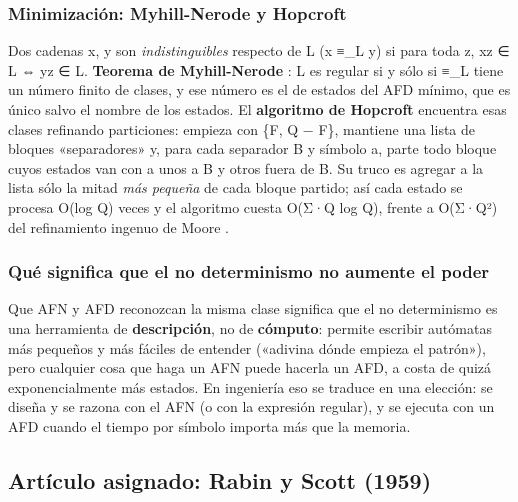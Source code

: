 \hypertarget{minimizaciuxf3n-myhill-nerode-y-hopcroft}{%
\subsubsection{Minimización: Myhill-Nerode y Hopcroft}\label{minimizaciuxf3n-myhill-nerode-y-hopcroft}}

Dos cadenas x, y son \emph{indistinguibles} respecto de L (x ≡\_L y) si para toda z, xz ∈ L ⇔ yz ∈ L. \textbf{Teorema de Myhill-Nerode} \autocite{nerode1958}: L es regular si y sólo si ≡\_L tiene un número finito de clases, y ese número es el de estados del AFD mínimo, que es único salvo el nombre de los estados. El \textbf{algoritmo de Hopcroft} \autocite{hopcroft1971} encuentra esas clases refinando particiones: empieza con \{F, Q − F\}, mantiene una lista de bloques «separadores» y, para cada separador B y símbolo a, parte todo bloque cuyos estados van con a unos a B y otros fuera de B. Su truco es agregar a la lista sólo la mitad \emph{más pequeña} de cada bloque partido; así cada estado se procesa O(log \textbar Q\textbar) veces y el algoritmo cuesta O(\textbar Σ\textbar·\textbar Q\textbar{} log \textbar Q\textbar), frente a O(\textbar Σ\textbar·\textbar Q\textbar²) del refinamiento ingenuo de Moore \autocite{moore1971}.

\hypertarget{quuxe9-significa-que-el-no-determinismo-no-aumente-el-poder}{%
\subsubsection{Qué significa que el no determinismo no aumente el poder}\label{quuxe9-significa-que-el-no-determinismo-no-aumente-el-poder}}

Que AFN y AFD reconozcan la misma clase significa que el no determinismo es una herramienta de \textbf{descripción}, no de \textbf{cómputo}: permite escribir autómatas más pequeños y más fáciles de entender («adivina dónde empieza el patrón»), pero cualquier cosa que haga un AFN puede hacerla un AFD, a costa de quizá exponencialmente más estados. En ingeniería eso se traduce en una elección: se diseña y se razona con el AFN (o con la expresión regular), y se ejecuta con un AFD cuando el tiempo por símbolo importa más que la memoria.

\hypertarget{artuxedculo-asignado-rabin-y-scott-1959}{%
\subsection{Artículo asignado: Rabin y Scott (1959)}\label{artuxedculo-asignado-rabin-y-scott-1959}}

